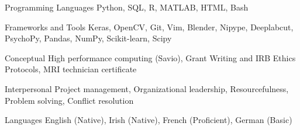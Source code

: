 

\begin{cvskills}

 \cvskill
  	{Programming Languages}
    {Python, SQL, R, MATLAB, HTML, Bash} %
  
 \cvskill
   {Frameworks and Tools}
   {Keras, OpenCV, Git, Vim, Blender, Nipype, Deeplabcut, PsychoPy, Pandas, NumPy, Scikit-learn, Scipy}
   
 \cvskill
   {Conceptual}
   {High performance computing (Savio), Grant Writing and IRB Ethics Protocols, MRI technician certificate}
  
 \cvskill
   {Interpersonal}
   {Project management, Organizational leadership, Resourcefulness, Problem solving, Conflict resolution}
   
  \cvskill
   {Languages}
   {English (Native), Irish (Native), French (Proficient), German (Basic)}
    

\end{cvskills}
